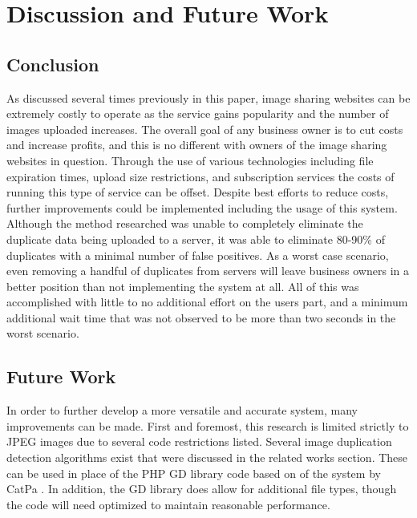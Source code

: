 %
%
%

\chapter{Discussion and Future Work}\label{ch:conclusion}

\section{Conclusion}
As discussed several times previously in this paper, image sharing websites can be extremely costly to operate as the service gains popularity and the number of images uploaded increases. The overall goal of any business owner is to cut costs and increase profits, and this is no different with owners of the image sharing websites in question. Through the use of various technologies including file expiration times, upload size restrictions, and subscription services the costs of running this type of service can be offset. Despite best efforts to reduce costs, further improvements could be implemented including the usage of this system. Although the method researched was unable to completely eliminate the duplicate data being uploaded to a server, it was able to eliminate 80-90\% of duplicates with a minimal number of false positives. As a worst case scenario, even removing a handful of duplicates from servers will leave business owners in a better position than not implementing the system at all. All of this was accomplished with little to no additional effort on the users part, and a minimum additional wait time that was not observed to be more than two seconds in the worst scenario.

\section{Future Work}
In order to further develop a more versatile and accurate system, many improvements can be made. First and foremost, this research is limited strictly to JPEG images due to several code restrictions listed. Several image duplication detection algorithms exist that were discussed in the related works section. These can be used in place of the PHP GD library code based on of the system by CatPa \cite{catpa:gdcode}. In addition, the GD library does allow for additional file types, though the code will need optimized to maintain reasonable performance.

